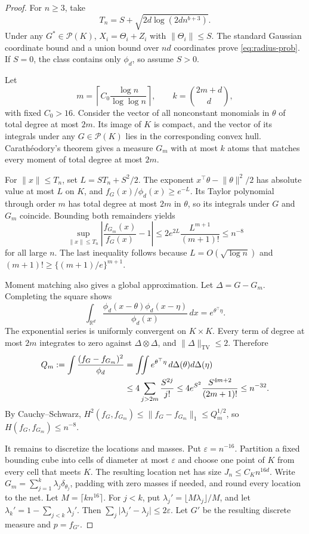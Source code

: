 \documentclass[11pt]{article}
\theoremstyle{definition}
\theoremstyle{remark}
\DeclareMathOperator{\TV}{TV}
\newcommand{\Pcal}{\mathcal P}
\newcommand{\RR}{\mathbb R}
\newcommand{\norm}[1]{\lVert #1\rVert}
\newcommand{\abs}[1]{\lvert #1\rvert}
\newcommand{\eps}{\varepsilon}
\begin{document}
\begin{proof}
For $n\ge3$, take
\[
 T_n=S+\sqrt{2d\log(2d n^{b+3})}.
\]
Under any $G^*\in\Pcal(K)$, $X_i=\Theta_i+Z_i$ with
$\norm{\Theta_i}\le S$.  The standard Gaussian coordinate bound and a union
bound over $nd$ coordinates prove \eqref{eq:radius-prob}.  If $S=0$, the class
contains only $\phi_d$, so assume $S>0$.

Let
\[
 m=\left\lceil C_0\frac{\log n}{\log\log n}\right\rceil,
 \qquad k=\binom{2m+d}{d},
\]
with fixed $C_0>16$.  Consider the vector of all nonconstant monomials in
$\theta$ of total degree at most $2m$.  Its image of $K$ is compact, and the
vector of its integrals under any $G\in\Pcal(K)$ lies in the corresponding
convex hull.  Carath\'eodory's theorem gives a measure $G_m$ with at most $k$
atoms that matches every moment of total degree at most $2m$.

For $\norm{x}\le T_n$, set $L=ST_n+S^2/2$.  The exponent
$x^\top\theta-\norm{\theta}^2/2$ has absolute value at most $L$ on $K$, and
$f_G(x)/\phi_d(x)\ge e^{-L}$.  Its Taylor polynomial through order $m$ has
total degree at most $2m$ in $\theta$, so its integrals under $G$ and $G_m$
coincide.  Bounding both remainders yields
\begin{equation}\label{eq:relative-approx}
 \sup_{\norm{x}\le T_n}
 \left|\frac{f_{G_m}(x)}{f_G(x)}-1\right|
 \le2e^{2L}\frac{L^{m+1}}{(m+1)!}\le n^{-8}
\end{equation}
for all large $n$.  The last inequality follows because
$L=O(\sqrt{\log n})$ and
$(m+1)!\ge\{(m+1)/e\}^{m+1}$.

Moment matching also gives a global approximation.  Let
$\Delta=G-G_m$.  Completing the square shows
\[
 \int_{\RR^d}
 \frac{\phi_d(x-\theta)\phi_d(x-\eta)}{\phi_d(x)}\,dx
 =e^{\theta^\top\eta}.
\]
The exponential series is uniformly convergent on $K\times K$.  Every term
of degree at most $2m$ integrates to zero against $\Delta\otimes\Delta$, and
$\norm{\Delta}_{\TV}\le2$.  Therefore
\begin{align}
 Q_m:=\int\frac{(f_G-f_{G_m})^2}{\phi_d}
 &=\iint e^{\theta^\top\eta}\,d\Delta(\theta)d\Delta(\eta)\notag\\
 &\le4\sum_{j>2m}\frac{S^{2j}}{j!}
 \le4e^{S^2}\frac{S^{4m+2}}{(2m+1)!}\le n^{-32}.
 \label{eq:Qm}
\end{align}
By Cauchy--Schwarz,
$H^2(f_G,f_{G_m})\le\norm{f_G-f_{G_m}}_1\le Q_m^{1/2}$, so
$H(f_G,f_{G_m})\le n^{-8}$.

It remains to discretize the locations and masses.  Put $\eps=n^{-16}$.
Partition a fixed bounding cube into cells of diameter at most $\eps$ and
choose one point of $K$ from every cell that meets $K$.  The resulting
location net has size $J_n\le C_Kn^{16d}$.  Write
$G_m=\sum_{j=1}^k\lambda_j\delta_{\theta_j}$, padding with zero masses if
needed, and round every location to the net.  Let
$M=\lceil kn^{16}\rceil$.  For $j<k$, put
$\lambda_j'=\lfloor M\lambda_j\rfloor/M$, and let
$\lambda_k'=1-\sum_{j<k}\lambda_j'$.  Then
$\sum_j\abs{\lambda_j'-\lambda_j}\le2\eps$.  Let $G'$ be the resulting
discrete measure and $p=f_{G'}$.


\end{proof}
\end{document}
